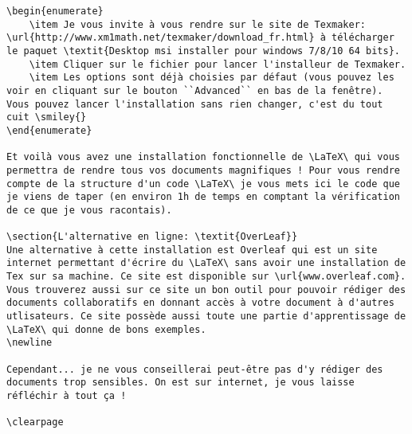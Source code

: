 \documentclass[11pt,a4paper]{article} %
\begin{document}
\begin{Verbatim}[breaklines=true]
\begin{enumerate}
	\item Je vous invite à vous rendre sur le site de Texmaker: \url{http://www.xm1math.net/texmaker/download_fr.html} à télécharger le paquet \textit{Desktop msi installer pour windows 7/8/10 64 bits}.
	\item Cliquer sur le fichier pour lancer l'installeur de Texmaker.
	\item Les options sont déjà choisies par défaut (vous pouvez les voir en cliquant sur le bouton ``Advanced`` en bas de la fenêtre). Vous pouvez lancer l'installation sans rien changer, c'est du tout cuit \smiley{}
\end{enumerate}

Et voilà vous avez une installation fonctionnelle de \LaTeX\ qui vous permettra de rendre tous vos documents magnifiques ! Pour vous rendre compte de la structure d'un code \LaTeX\ je vous mets ici le code que je viens de taper (en environ 1h de temps en comptant la vérification de ce que je vous racontais).

\section{L'alternative en ligne: \textit{OverLeaf}}
Une alternative à cette installation est Overleaf qui est un site internet permettant d'écrire du \LaTeX\ sans avoir une installation de Tex sur sa machine. Ce site est disponible sur \url{www.overleaf.com}. Vous trouverez aussi sur ce site un bon outil pour pouvoir rédiger des documents collaboratifs en donnant accès à votre document à d'autres utlisateurs. Ce site possède aussi toute une partie d'apprentissage de \LaTeX\ qui donne de bons exemples.
\newline

Cependant... je ne vous conseillerai peut-être pas d'y rédiger des documents trop sensibles. On est sur internet, je vous laisse réfléchir à tout ça !

\clearpage
\end{Verbatim}
\end{document}
